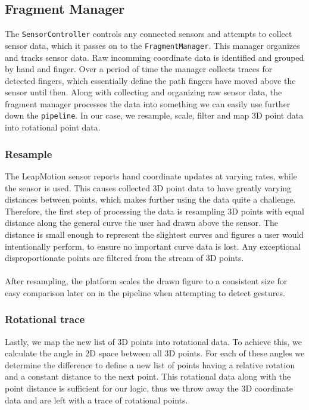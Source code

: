 \documentclass{standalone}
\begin{document}
  \subsection{Fragment Manager}
  The \verb_SensorController_ controls any connected sensors and attempts to
  collect sensor data, which it passes on to the \verb_FragmentManager_. This
  manager organizes and tracks sensor data. Raw incomming coordinate data is
  identified and grouped by hand and finger. Over a period of time the manager
  collects traces for detected fingers, which essentially define the path
  fingers have moved above the sensor until then. Along with collecting and
  organizing raw sensor data, the fragment manager processes the data into
  something we can easily use further down the \verb_pipeline_. In our case, we
  resample, scale, filter and map 3D point data into rotational point data.

  \subsubsection{Resample}
  The LeapMotion sensor reports hand coordinate updates at varying rates, while
  the sensor is used. This causes collected 3D point data to have greatly
  varying distances between points, which makes further using the data quite a
  challenge. Therefore, the first step of processing the data is resampling 3D
  points with equal distance along the general curve the user had drawn above
  the sensor. The distance is small enough to represent the slightest curves and
  figures a user would intentionally perform, to ensure no important curve data
  is lost. Any exceptional disproportionate points are filtered from the stream
  of 3D points.

  \paragraph{}
  After resampling, the platform scales the drawn figure to a consistent size
  for easy comparison later on in the pipeline when attempting to detect
  gestures.

  \subsubsection{Rotational trace}
  Lastly, we map the new list of 3D points into rotational data. To achieve
  this, we calculate the angle in 2D space between all 3D points. For each of
  these angles we determine the difference to define a new list of points having
  a relative rotation and a constant distance to the next point.
  This rotational data along with the point distance is sufficient for our logic,
  thus we throw away the 3D coordinate data and are left with a trace of
  rotational points.
\end{document}
